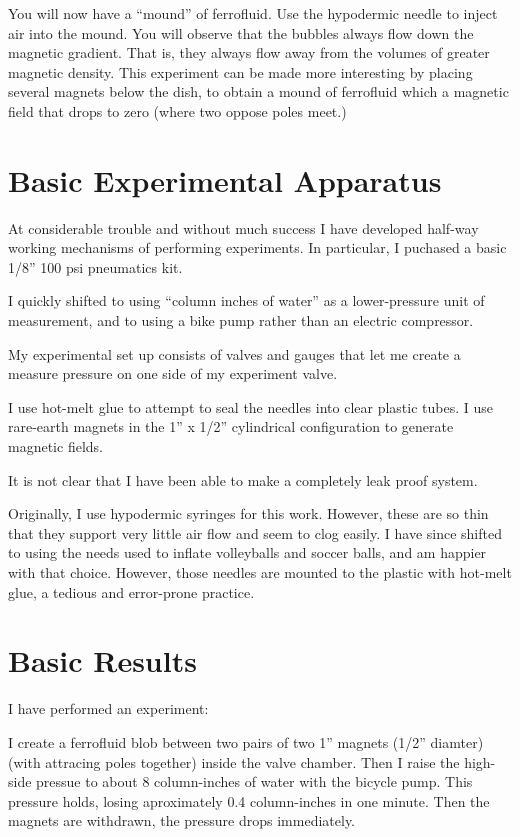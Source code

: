 \documentclass{article}
\begin{document}
You will now have a ``mound'' of ferrofluid.  Use the hypodermic needle to inject air into the mound.  You will
observe that the bubbles always flow down the magnetic gradient. That is, they always flow away from the volumes
of greater magnetic density.  This experiment can be made more interesting by placing several magnets below
the dish, to obtain a mound of ferrofluid which a magnetic field that drops to zero (where two oppose poles
meet.)

\section{Basic Experimental Apparatus}

At considerable trouble and without much success I have developed half-way working mechanisms of
performing experiments. In particular, I puchased a basic 1/8'' 100 psi pneumatics kit.

I quickly shifted to using ``column inches of water'' as a lower-pressure unit of measurement,
and to using a bike pump rather than an electric compressor.

My experimental set up consists of valves and gauges that let me create a measure pressure on
one side of my experiment valve.

I use hot-melt glue to attempt to seal the needles into clear plastic tubes.  I use rare-earth
magnets in the 1'' x 1/2'' cylindrical configuration to generate magnetic fields.

It is not clear that I have been able to make a completely leak proof system.

Originally, I use hypodermic syringes for this work.  However, these are so thin that they
support very little air flow and seem to clog easily.  I have since shifted to using the
needs used to inflate volleyballs and soccer balls, and am happier with that choice.
However, those needles are mounted to the plastic with hot-melt glue, a tedious and error-prone practice.

\section{Basic Results}

I have performed an experiment:

I create a ferrofluid blob between two pairs of two 1'' magnets (1/2'' diamter) (with attracing poles together)
inside the valve chamber.  Then I raise the high-side pressue to about 8 column-inches of water with the bicycle pump.
This pressure holds, losing aproximately 0.4 column-inches in one minute.  Then the magnets are withdrawn, the pressure
drops immediately.
\end{document}
